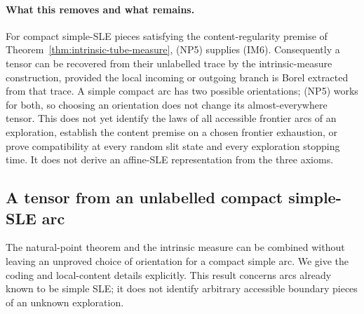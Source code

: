 \documentclass[11pt]{article}
\theoremstyle{definition}\newtheorem{definition}[theorem]{Definition}
\theoremstyle{remark}\newtheorem{remark}[theorem]{Remark}
\begin{document}
\paragraph{What this removes and what remains.}
For compact simple-SLE pieces satisfying the content-regularity premise
of Theorem~\ref{thm:intrinsic-tube-measure}, (NP5) supplies (IM6).
Consequently a tensor can be recovered from their unlabelled trace by
the intrinsic-measure construction, provided the local incoming or
outgoing branch is Borel extracted from that trace. A simple compact
arc has two possible orientations; (NP5) works for both, so choosing
an orientation does not change its almost-everywhere tensor.
This does not yet identify the laws of all accessible frontier arcs of
an exploration, establish the content premise on a chosen frontier
exhaustion, or prove compatibility at every random slit state and
every exploration stopping time. It does not derive an affine-SLE
representation from the three axioms.



\subsection{A tensor from an unlabelled compact simple-SLE arc}
\label{sec:unlabelled-simple-arc}

The natural-point theorem and the intrinsic measure can be combined
without leaving an unproved choice of orientation for a compact simple
arc. We give the coding and local-content details explicitly. This
result concerns arcs already known to be simple SLE; it does not identify
arbitrary accessible boundary pieces of an unknown exploration.
\end{document}
